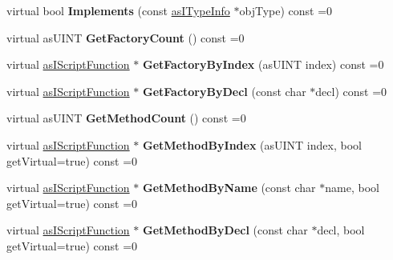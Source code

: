 \begin{DoxyCompactItemize}
\item 
\mbox{\label{classas_i_type_info_a19bacd881681ee398de95a076f427726}} 
virtual bool {\bfseries Implements} (const \hyperlink{classas_i_type_info}{as\+I\+Type\+Info} $\ast$obj\+Type) const =0
\item 
\mbox{\label{classas_i_type_info_a22cb802db08d6f464f6ee12337390d12}} 
virtual as\+U\+I\+NT {\bfseries Get\+Factory\+Count} () const =0
\item 
\mbox{\label{classas_i_type_info_a6a8b52fefd309102142ba74621d35714}} 
virtual \hyperlink{classas_i_script_function}{as\+I\+Script\+Function} $\ast$ {\bfseries Get\+Factory\+By\+Index} (as\+U\+I\+NT index) const =0
\item 
\mbox{\label{classas_i_type_info_aca1e08cd395231d30ad78a7ca3fea142}} 
virtual \hyperlink{classas_i_script_function}{as\+I\+Script\+Function} $\ast$ {\bfseries Get\+Factory\+By\+Decl} (const char $\ast$decl) const =0
\item 
\mbox{\label{classas_i_type_info_a50877d3602e460e784df4f611ae6f360}} 
virtual as\+U\+I\+NT {\bfseries Get\+Method\+Count} () const =0
\item 
\mbox{\label{classas_i_type_info_a235262cb0bacaf1f160e5ac5156db4e8}} 
virtual \hyperlink{classas_i_script_function}{as\+I\+Script\+Function} $\ast$ {\bfseries Get\+Method\+By\+Index} (as\+U\+I\+NT index, bool get\+Virtual=true) const =0
\item 
\mbox{\label{classas_i_type_info_af3febbb10e7e85425f0960aad892f9b8}} 
virtual \hyperlink{classas_i_script_function}{as\+I\+Script\+Function} $\ast$ {\bfseries Get\+Method\+By\+Name} (const char $\ast$name, bool get\+Virtual=true) const =0
\item 
\mbox{\label{classas_i_type_info_a80c61bb4d018647561ce3af24fedf65b}} 
virtual \hyperlink{classas_i_script_function}{as\+I\+Script\+Function} $\ast$ {\bfseries Get\+Method\+By\+Decl} (const char $\ast$decl, bool get\+Virtual=true) const =0
\item 
\mbox{\label{classas_i_type_info_a01d086e1bb97aa56a7b128c00c174ac6}} 

\end{DoxyCompactItemize}
